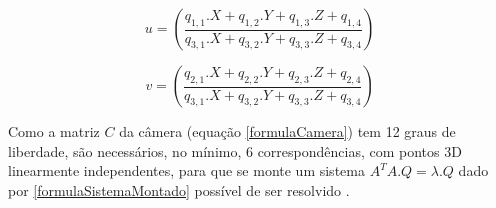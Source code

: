	\begin{equation}
		\label{formulaSistemaSimples1}
		u = \left(\frac{q_{1,1} . X + q_{1,2} . Y + q_{1,3} . Z + q_{1,4}}{q_{3,1} . X + q_{3,2} . Y + q_{3,3} . Z + q_{3,4}} \right)
	\end{equation}
	
	\begin{equation}
		\label{formulaSistemaSimples2}
		v = \left(\frac{q_{2,1} . X + q_{2,2} . Y + q_{2,3} . Z + q_{2,4}}{q_{3,1} . X + q_{3,2} . Y + q_{3,3} . Z + q_{3,4}} \right) 
	\end{equation}
	
	Como a matriz $C$ da câmera (equação \ref{formulaCamera}) tem 12 graus de liberdade, são necessários, no mínimo, 6 correspondências, com pontos 3D linearmente independentes, para que se monte um sistema $A^TA . Q = \lambda . Q$ dado por \ref{formulaSistemaMontado} possível de ser resolvido \cite{lectureCameraCalibration}.
	

